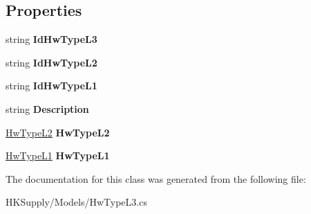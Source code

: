 \subsection*{Properties}
\begin{DoxyCompactItemize}
\item 
\mbox{\label{class_h_k_supply_1_1_models_1_1_hw_type_l3_a3922491269c83d4e3102ca61df5b24c7}} 
string {\bfseries Id\+Hw\+Type\+L3}
\item 
\mbox{\label{class_h_k_supply_1_1_models_1_1_hw_type_l3_af0e4c07b60c8cb7e76439c32d044c06b}} 
string {\bfseries Id\+Hw\+Type\+L2}
\item 
\mbox{\label{class_h_k_supply_1_1_models_1_1_hw_type_l3_a14b06729a71ff35a267e49f5ce27edb9}} 
string {\bfseries Id\+Hw\+Type\+L1}
\item 
\mbox{\label{class_h_k_supply_1_1_models_1_1_hw_type_l3_a886f9e0a34aa8d84391a85ae8d947b88}} 
string {\bfseries Description}
\item 
\mbox{\label{class_h_k_supply_1_1_models_1_1_hw_type_l3_aa82c3a389f7e1c15478d41247b8261be}} 
\mbox{\hyperlink{class_h_k_supply_1_1_models_1_1_hw_type_l2}{Hw\+Type\+L2}} {\bfseries Hw\+Type\+L2}
\item 
\mbox{\label{class_h_k_supply_1_1_models_1_1_hw_type_l3_a0057eaf318be99ae7ea2d907755ba015}} 
\mbox{\hyperlink{class_h_k_supply_1_1_models_1_1_hw_type_l1}{Hw\+Type\+L1}} {\bfseries Hw\+Type\+L1}
\end{DoxyCompactItemize}


The documentation for this class was generated from the following file\+:\begin{DoxyCompactItemize}
\item 
H\+K\+Supply/\+Models/Hw\+Type\+L3.\+cs\end{DoxyCompactItemize}
